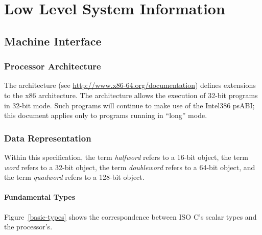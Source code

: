 \chapter{Low Level System Information}

\section{Machine Interface}

\subsection{Processor Architecture}

The \xARCH architecture (see
\url{http://www.x86-64.org/documentation}) defines extensions to
the x86 architecture.  The \xARCH architecture allows the execution of
32-bit programs in 32-bit mode.  Such programs will continue to make
use of the Intel386 psABI; this document applies only to programs
running in ``long'' mode.

\subsection{Data Representation}

Within this specification, the term \emph{halfword} refers to a 16-bit
object, the term \emph{word} refers to a 32-bit object, the term
\emph{doubleword} refers to a 64-bit object, and the term
\emph{quadword} refers to a 128-bit object.

\subsubsection{Fundamental Types}

Figure~\ref{basic-types} shows the correspondence between ISO C's
scalar types and the processor's.


